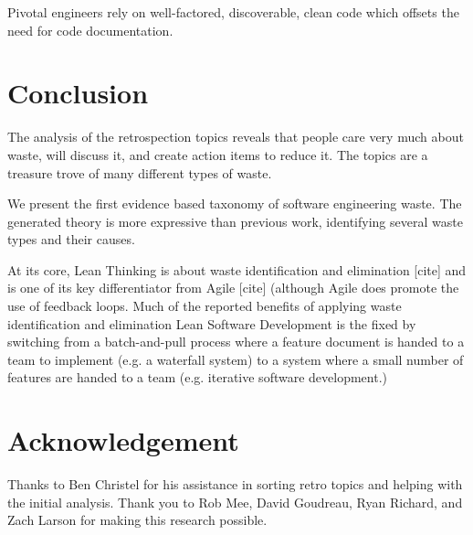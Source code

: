 Pivotal engineers rely on well-factored, discoverable, clean code which offsets the need for code documentation. 
\section{Conclusion}
The analysis of the retrospection topics reveals that people care very much about waste, will discuss it, and create action items to reduce it. The topics are a treasure trove of many different types of waste.

We present the first evidence based taxonomy of software engineering waste. The generated theory is more expressive than previous work, identifying several waste types and their causes.

At its core, Lean Thinking is about waste identification and elimination [cite] and is one of its key differentiator from Agile [cite] (although Agile does promote the use of feedback loops. Much of the reported benefits of applying waste identification and elimination Lean Software Development is the fixed by switching from a batch-and-pull process where a feature document is handed to a team to implement (e.g. a waterfall system) to a system where a small number of features are handed to a team (e.g. iterative software development.)
\section*{Acknowledgement}
Thanks to Ben Christel for his assistance in sorting retro topics and helping with the initial analysis. Thank you to Rob Mee, David Goudreau, Ryan Richard, and Zach Larson for making this research possible.


